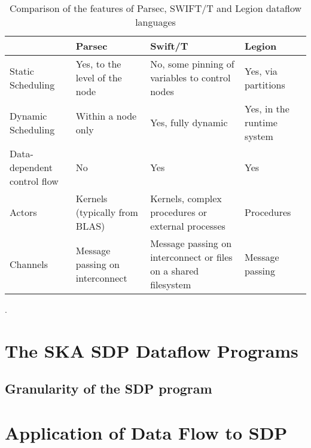 \documentclass[11pt,a4paper]{article}
\begin{document}
\begin{table}
\begin{tabular}{|p{}|p{}|p{}|p{}|}
 \hline
& Parsec & Swift/T & Legion\\\hline
Static Scheduling &
Yes, to the level of the node &
No, some pinning of variables to control nodes  &
Yes, via partitions
\\\hline
Dynamic Scheduling &
Within a node only&
Yes, fully dynamic&
Yes, in the runtime system\\\hline
Data-dependent control flow &
No & Yes & Yes \\\hline
Actors & Kernels (typically from BLAS) & Kernels, complex procedures or external processes & Procedures \\\hline
Channels &
Message passing on interconnect &
Message passing on interconnect or files on a shared filesystem & Message passing \\\hline
\end{tabular}
\caption{Comparison of the features of Parsec, SWIFT/T and Legion dataflow languages}.
\label{tab:dataflowcomparision}
\end{table}

\section{The SKA SDP Dataflow Programs}
\label{sec:dataflow-examples}

\subsection{Granularity of the SDP program}

\section{Application of Data Flow to SDP}
\label{sec:dataflow-sdp-application}
\end{document}

